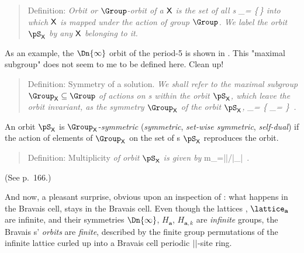     \begin{quote}
Definition: {\em
{\em Orbit} or \emph{$\Group$-orbit} of a {\lattstate} $\mathsf{X}$ is the
set of all {\lattstate}s
\beq
    \pS_\Xx = \{\LieEl\,\Xx \mid \LieEl \in {\Group}\}
into which $\mathsf{X}$ is mapped under the action of group $\Group$.
We label the orbit $\pS_\Xx$ by any {\lattstate} $\mathsf{X}$ belonging to
it.
            }
    \end{quote}
As an example, the $\Dn{\infty}$ orbit of the period-5 {\lattstate}
is shown in .
     {
    This "maximal subgroup" does not seem to me to be defined here.
    Clean up!
    }
    \begin{quote}
Definition: Symmetry of a solution.
{\em
We shall refer to the maximal subgroup $\Group_\Xx \subseteq  \Group$ of
actions on {\lattstate}s within the orbit $\pS_\Xx$, which leave
the orbit invariant, as the \emph{symmetry}
$\Group_\Xx$ of the orbit $\pS_\Xx$,
\beq
\Group_\Xx =
   \{ \LieEl \in \Group_\Xx \mid \LieEl \Xx = \Xx
   \}
\,.
}
    \end{quote}
An orbit $\pS_\Xx$ is $\Group_\Xx$-{\em symmetric}
({\em symmetric}, {\em set-wise symmetric}, {\em self-dual})
if the action of elements of $\Group_\Xx$ on
the set of {\lattstate}s $\pS_\Xx$ reproduces the orbit.
%
    \begin{quote}
Definition: Multiplicity
{\em
of orbit $\pS_\Xx$ is given by
}
\beq
m_\Xx=|\Group|/|\Group_{\Xx}|
\,.
    \end{quote}
(See  {p.~166}.)



\bigskip

And now, a pleasant surprise, obvious upon an inspection of
: what happens
in the Bravais cell, stays in the Bravais cell.
Even though
the lattices \lattice, $\lattice_{\mathbf{a}}$ are infinite,
and their symmetries
$\Dn{\infty}$, $H_{\mathbf{a}}$, $H_{\mathbf{a},k}$ are
\emph{infinite} groups, the Bravais {\lattstate}s'
\emph{orbits} are \emph{finite}, described by the finite group
permutations of the infinite lattice curled up into a Bravais cell periodic
${||}$-site ring.


